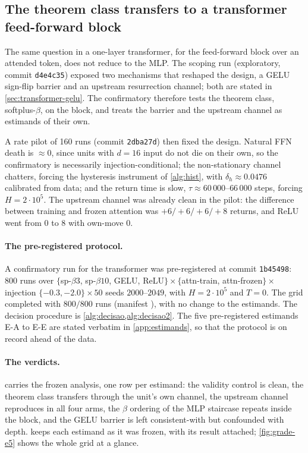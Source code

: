 \documentclass[11pt]{article}
\theoremstyle{definition}
\theoremstyle{remark}
\begin{document}
\subsection{The theorem class transfers to a transformer feed-forward
block}\label{sec:transformer}

The same question in a one-layer transformer, for the feed-forward block over an
attended token, does not reduce to the MLP. The scoping run (exploratory, commit
\texttt{d4e4c35}) exposed two mechanisms that reshaped the design, a GELU
sign-flip barrier and an upstream resurrection channel; both are stated in
\cref{sec:transformer-gelu}. The confirmatory therefore tests the theorem class,
softplus-$\beta$, on the block, and treats the barrier and the upstream channel
as estimands of their own.

A rate pilot of 160 runs (commit \texttt{2dba27d}) then fixed the design. Natural
FFN death is $\approx0$, since units with $d=16$ input do not die on their own,
so the confirmatory is necessarily injection-conditional; the non-stationary
channel chatters, forcing the hysteresis instrument of \cref{alg:hist}, with
$\delta_h\approx0.0476$ calibrated from data; and the return time is
slow, $\tau\approx60\,000$--$66\,000$ steps, forcing
$H=2\cdot10^{5}$. The upstream channel was already clean in the pilot: the
difference between training and frozen attention was $+6/+6/+6/+8$ returns, and
ReLU went from $0$ to $8$ with own-move $0$.

\paragraph{The pre-registered protocol.}
A confirmatory run for the transformer was pre-registered at commit
\texttt{1b45498}: 800 runs over
$\{$sp-$\beta3$, sp-$\beta10$, GELU, ReLU$\}\times\{$attn-train,
attn-frozen$\}\times$ injection $\{-0.3,-2.0\}\times50$ seeds $2000$--$2049$,
with $H=2\cdot10^{5}$ and $T=0$. The grid completed with $800/800$ runs
(manifest ), with no change to the estimands. The
decision procedure is \cref{alg:decisao,alg:decisao2}. The five pre-registered
estimands E-A
to E-E are stated verbatim in \cref{app:estimands}, so that the protocol is on
record ahead of the data.

\paragraph{The verdicts.}
 carries the frozen analysis, one row per estimand: the validity
control is clean, the theorem class transfers through the unit's own channel,
the upstream channel reproduces in all four arms, the $\beta$ ordering of the
MLP staircase repeats inside the block, and the GELU barrier is left
consistent-with but confounded with depth.  keeps each
estimand as it was frozen, with its result attached; \cref{fig:grade-e5} shows
the whole grid at a glance.
\end{document}
